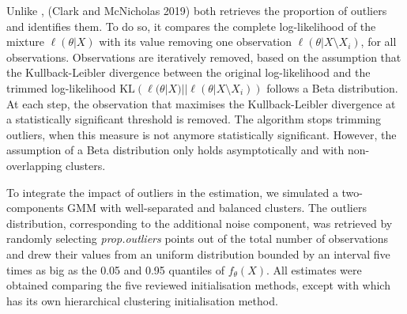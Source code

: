 Unlike ,  (Clark and McNicholas 2019) both retrieves the
proportion of outliers and identifies them. To do so, it compares the
complete log-likelihood of the mixture \(\ell(\theta|X)\) with its value
removing one observation \(\ell(\theta | X \setminus X_i)\), for all
observations. Observations are iteratively removed, based on the
assumption that the Kullback-Leibler divergence between the original
log-likelihood and the trimmed log-likelihood
\(\text{KL}\left(\ell(\theta|X)|| \ell(\theta | X \setminus X_i)\right)\)
follows a Beta distribution. At each step, the observation that
maximises the Kullback-Leibler divergence at a statistically significant
threshold is removed. The algorithm stops trimming outliers, when this
measure is not anymore statistically significant. However, the
assumption of a Beta distribution only holds asymptotically and with
non-overlapping clusters.

To integrate the impact of outliers in the estimation, we simulated a
two-components GMM with well-separated and balanced clusters. The
outliers distribution, corresponding to the additional noise component,
was retrieved by randomly selecting \emph{prop.outliers} points out of the
total number of observations and drew their values from an uniform
distribution bounded by an interval five times as big as the 0.05 and
0.95 quantiles of \(f_\theta(X)\). All estimates were obtained comparing
the five reviewed initialisation methods, except with 
which has its own hierarchical clustering initialisation method.

